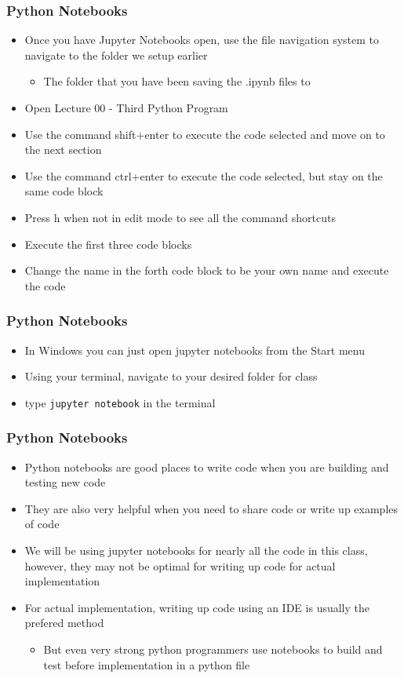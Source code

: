 \documentclass[mini frame in current subsection]{beamer}
\begin{document}
		\begin{frame}
			\frametitle{Python Notebooks}
			\begin{itemize}
				\vfill \item  Once you have Jupyter Notebooks open, use the file navigation system to navigate to the folder we setup earlier
					\begin{itemize}
						\item  The folder that you have been saving the .ipynb files to
					\end{itemize}
				\vfill\item  Open Lecture 00 - Third Python Program
				\vfill\item  Use the command shift+enter to execute the code selected and move on to the next section
				\vfill\item  Use the command ctrl+enter to execute the code selected, but stay on the same code block
				\vfill\item  Press h when not in edit mode to see all the command shortcuts
				\vfill\item  Execute the first three code blocks
				\vfill\item  Change the name in the forth code block to be your own name and execute the code
			\end{itemize}
		\end{frame}
	
		\begin{frame}
			\frametitle{Python Notebooks}
			\begin{itemize}
				\vfill \item  In Windows you can just open jupyter notebooks from the Start menu
				\vfill \item  Using your terminal, navigate to your desired folder for class
				\vfill \item  type \texttt{jupyter notebook} in the terminal
			\end{itemize}
		\end{frame}
	
		\begin{frame}
			\frametitle{Python Notebooks}
			\begin{itemize}
				\vfill \item  Python notebooks are good places to write code when you are building and testing new code
				\vfill\item  They are also very helpful when you need to share code or write up examples of code
				\vfill\item  We will be using jupyter notebooks for nearly all the code in this class, however, they may not be optimal for writing up code for actual implementation
				\vfill\item  For actual implementation, writing up code using an IDE is usually the prefered method
					\begin{itemize}
						\item  But even very strong python programmers use notebooks to build and test before implementation in a python file
					\end{itemize}
			\end{itemize}
		\end{frame}
		
\end{document}
